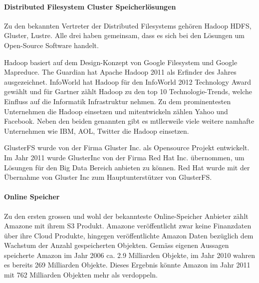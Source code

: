 \paragraph*{Distributed Filesystem Cluster Speicherlösungen}
Zu den bekannten Vertreter der Distributed Filesystems gehören Hadoop HDFS, Gluster, Lustre. Alle drei haben gemeinsam, dass es sich bei den Lösungen um Open-Source Software handelt.

Hadoop basiert auf dem Design-Konzept von Google Filesystem und Google Mapreduce. The Guardian hat Apache Hadoop 2011 als Erfinder des Jahres ausgezeichnet. InfoWorld hat Hadoop für den InfoWorld 2012 Technology Award gewählt und für Gartner zählt Hadoop zu den top 10 Technologie-Trends, welche Einfluss auf die Informatik Infrastruktur nehmen. 
Zu dem prominentesten Unternehmen die Hadoop einsetzen und mitentwickeln zählen Yahoo und Facebook. Neben den beiden genannten gibt es mtllerweile viele weitere namhafte Unternehmen wie IBM, AOL, Twitter die Hadoop einsetzen. \cite{Guardian}\cite{Wayner2012}\cite{Casonato2012}\cite{Hadoop2012}

GlusterFS wurde von der Firma Gluster Inc. als Opensource Projekt entwickelt. Im Jahr 2011 wurde GlusterInc von der Firma Red Hat Inc. übernommen, um Lösungen für den Big Data Bereich anbieten zu können. Red Hat wurde mit der Übernahme von Gluster Inc zum Hauptunterstützer von GlusterFS.

\paragraph*{Online Speicher}
Zu den ersten grossen und wohl der bekannteste Online-Speicher Anbieter zählt Amazone mit ihrem S3 Produkt. Amazone veröffentlicht zwar keine Finanzdaten über ihre Cloud Produkte, hingegen veröffentlichte Amazon Daten bezüglich dem Wachstum der Anzahl gespeicherten Objekten. Gemäss eigenen Aussagen speicherte Amazon im Jahr 2006 ca. 2.9 Milliarden Objekte, im Jahr 2010 wahren es bereits 269 Milliarden Objekte. Dieses Ergebnis könnte Amazon im Jahr 2011 mit 762 Milliarden Objekten mehr als verdoppeln. \cite{Barr2012}

